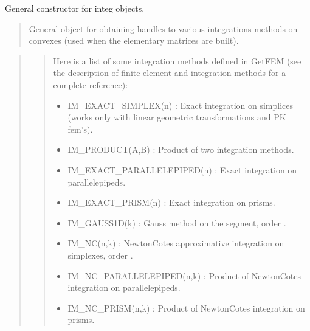 \documentclass[a4paper,11pt,english]{sphinxmanual}
\begin{document}
\begin{sphinxVerbatim}[commandchars=\\\{\}]
   
\end{sphinxVerbatim}


General constructor for integ objects.
\begin{quote}

General object for obtaining handles to various integrations methods on
convexes (used when the elementary matrices are built).
\end{quote}

\begin{quote}

\begin{quote}

Here is a list of some integration methods defined in GetFEM (see the
description of finite element and integration methods for a complete
reference):
\begin{itemize}
\item {} 
IM\_EXACT\_SIMPLEX(n) :
Exact integration on simplices (works only with linear geometric
transformations and PK fem’s).

\item {} 
IM\_PRODUCT(A,B) :
Product of two integration methods.

\item {} 
IM\_EXACT\_PARALLELEPIPED(n) :
Exact integration on parallelepipeds.

\item {} 
IM\_EXACT\_PRISM(n) :
Exact integration on prisms.

\item {} 
IM\_GAUSS1D(k) :
Gauss method on the segment, order .

\item {} 
IM\_NC(n,k) :
Newton\sphinxhyphen{}Cotes approximative integration on simplexes, order .

\item {} 
IM\_NC\_PARALLELEPIPED(n,k) :
Product of Newton\sphinxhyphen{}Cotes integration on parallelepipeds.

\item {} 
IM\_NC\_PRISM(n,k) :
Product of Newton\sphinxhyphen{}Cotes integration on prisms.


\end{itemize}
\end{quote}
\end{quote}
\end{document}
